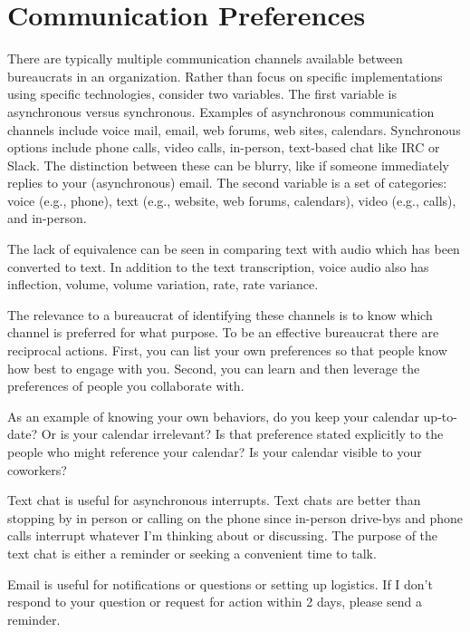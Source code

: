 \section{Communication Preferences}

There are typically multiple communication channels available between bureaucrats in an organization. Rather than focus on specific implementations using specific technologies, consider two variables. The first variable is asynchronous versus synchronous. Examples of asynchronous communication channels include voice mail, email, web forums, web sites, calendars. Synchronous options include phone calls, video calls, in-person, text-based chat like IRC or Slack. The distinction between these can be blurry, like if someone immediately replies to your (asynchronous) email.  The second variable is a set of categories: voice (e.g., phone), text (e.g., website, web forums, calendars), video (e.g., calls), and in-person. 

The lack of equivalence can be seen in comparing text with audio which has been converted to text. In addition to the text transcription, voice audio also has inflection, volume, volume variation, rate, rate variance.

The relevance to a bureaucrat of identifying these channels is to know which channel is preferred for what purpose. To be an effective bureaucrat there are reciprocal actions. First, you can list your own preferences so that people know how best to engage with you.
Second, you can learn and then leverage the preferences of people you collaborate with.

As an example of knowing your own behaviors, do you keep your calendar up-to-date? Or is your calendar irrelevant? Is that preference stated explicitly to the people who might reference your calendar? Is your calendar visible to your coworkers?

Text chat is useful for asynchronous interrupts. Text chats are better than stopping by in person or calling on the phone since in-person drive-bys and phone calls interrupt whatever I'm thinking about or discussing. The purpose of the text chat is either a reminder or seeking a convenient time to talk. 

Email is useful for notifications or questions or setting up logistics. If I don't respond to your question or request for action within 2 days, please send a reminder. 

